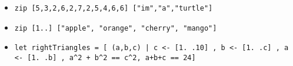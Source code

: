 \documentclass[a4paper,10pt]{article}
\begin{document}
\begin{enumerate}
\begin{enumerate}
\begin{itemize}
\begin{itemize}
\begin{itemize}
    \item \texttt{zip [5,3,2,6,2,7,2,5,4,6,6] ["im","a","turtle"]}
    \item \texttt{zip [1..] ["apple", "orange", "cherry", "mango"]}
    \item \texttt{let rightTriangles\textquotesingle \  = [ (a,b,c) | c <- [1. .10] , b <- [1. .c] , a <- [1. .b] , a\^{}2 + b\^{}2 == c\^{}2, a+b+c == 24]}
   \end{itemize}
  \end{itemize}
  \end{itemize}
  \end{enumerate}
\end{enumerate}
\end{document}
